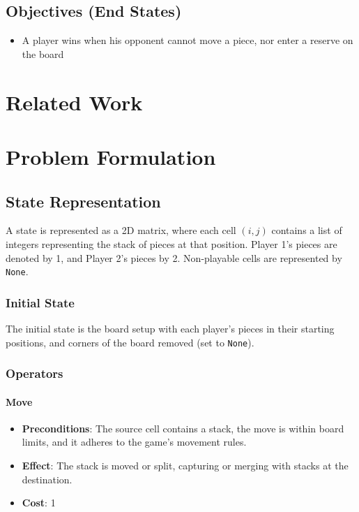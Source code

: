 \documentclass[a4paper, 11pt]{article}
\begin{document}
\subsection{Objectives (End States)}
\begin{itemize}
    \item A player wins when his opponent cannot move a piece, nor enter a reserve on
the board
\end{itemize}



\section{Related Work}

\section{Problem Formulation}
\subsection{State Representation}
A state is represented as a 2D matrix, where each cell \((i, j)\) contains a list of integers representing the stack of pieces at that position. Player 1's pieces are denoted by 1, and Player 2's pieces by 2. Non-playable cells are represented by \texttt{None}.

\subsubsection{Initial State}
The initial state is the board setup with each player's pieces in their starting positions, and corners of the board removed (set to \texttt{None}).

\subsubsection{Operators}

\paragraph{Move}
\begin{itemize}
    \item \textbf{Preconditions}: The source cell contains a stack, the move is within board limits, and it adheres to the game's movement rules.
    \item \textbf{Effect}: The stack is moved or split, capturing or merging with stacks at the destination.
    \item \textbf{Cost}: 1
\end{itemize}
\end{document}

